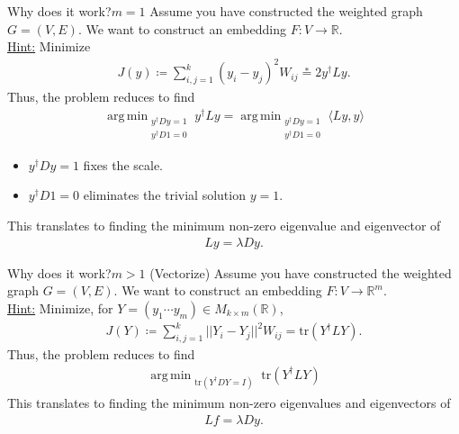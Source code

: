 \documentclass[11pt]{beamer}
\DeclareMathOperator*{\argmin}{arg\,min}
\begin{document}
\begin{frame}{Why does it work?}{$m=1$}
Assume you have constructed the weighted graph $G=(V, E)$. We want to construct an embedding $F: V\longrightarrow\mathbb{R}$.\\
\vspace{0.3cm}
\underline{Hint:} Minimize
\begin{align*}
J(y)\coloneqq \sum_{i,j=1}^k (y_i - y_j)^2 W_{ij} \stackrel{*}{=} 2 y^\dagger L y.
\end{align*}
\pause
Thus, the problem reduces to find
\begin{align*}
\argmin_{\substack{
y^\dagger D y = 1\\
y^\dagger D 1 = 0}}
y^\dagger L y
=
\argmin_{\substack{
y^\dagger D y = 1\\
y^\dagger D 1 = 0}}
\langle Ly, y \rangle 
\end{align*}
\begin{itemize}
\item $y^\dagger D y = 1$ fixes the scale. 
\item $y^\dagger D 1 = 0$ eliminates the trivial solution $y=1$.
\end{itemize}
\pause
This translates to finding the minimum non-zero eigenvalue and eigenvector of 
\begin{align*}
Ly=\lambda D y.
\end{align*} 
\end{frame}

\begin{frame}{Why does it work?}{$m>1$ (Vectorize)}
Assume you have constructed the weighted graph $G=(V, E)$. We want to construct an embedding $F: V\longrightarrow\mathbb{R}^m$.\\
\vspace{0.3cm}
\underline{Hint:} Minimize, for $Y=(y_1 \cdots y_m)\in M_{k\times m}(\mathbb{R})$, 
\begin{align*}
J(Y)\coloneqq \sum_{i,j=1}^k ||Y_i - Y_j||^2 W_{ij} = \text{tr}(Y^\dagger L Y).
\end{align*}
Thus, the problem reduces to find
\begin{align*}
\argmin_{\substack{
\text{tr}(Y^\dagger D Y = I)}}
\text{tr}(Y^\dagger L Y)
\end{align*}
This translates to finding the minimum non-zero eigenvalues and eigenvectors of 
\begin{align*}
Lf=\lambda D y.
\end{align*} 
\end{frame}
\end{document}
